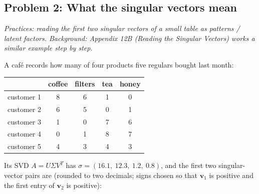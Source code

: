 \documentclass[
  11pt,
]{article}
\newcounter{none} %
\newcommand{\answerpage}{\clearpage}
\begin{document}
\answerpage

\subsection{Problem 2: What the singular vectors
mean}\label{problem-2-what-the-singular-vectors-mean}

\emph{Practices: reading the first two singular vectors of a small table
as patterns / latent factors. Background: Appendix 12B (Reading the
Singular Vectors) works a similar example step by step.}

A café records how many of four products five regulars bought last
month:

{\def\LTcaptype{none} %
\begin{longtable}[]{@{}lcccc@{}}
\toprule\noalign{}
& coffee & filters & tea & honey \\
\midrule\noalign{}
\endhead
\bottomrule\noalign{}
\endlastfoot
customer 1 & 8 & 6 & 1 & 0 \\
customer 2 & 6 & 5 & 0 & 1 \\
customer 3 & 1 & 0 & 7 & 6 \\
customer 4 & 0 & 1 & 8 & 7 \\
customer 5 & 4 & 3 & 4 & 3 \\
\end{longtable}
}

Its SVD \(A = U\Sigma V^T\) has \(\sigma = (16.1,\ 12.3,\ 1.2,\ 0.8)\),
and the first two singular-vector pairs are (rounded to two decimals;
signs chosen so that \(\mathbf v_1\) is positive and the first entry of
\(\mathbf v_2\) is positive):
\end{document}
